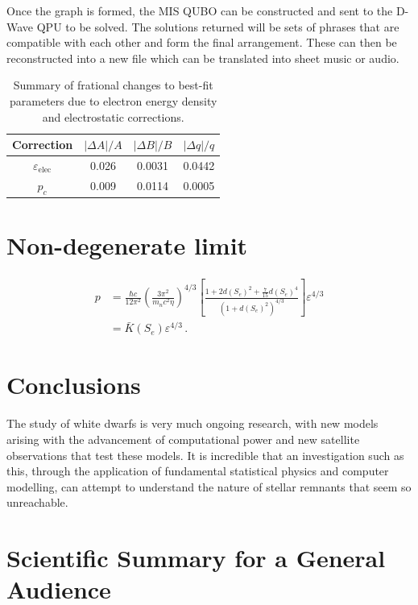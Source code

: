 \documentclass[aps,pra,10pt,twocolumn]{revtex4-2}
\begin{document}
Once the graph is formed, the MIS QUBO can be constructed and sent to the D-Wave QPU to be solved. The solutions returned will be sets of phrases that are compatible with each other and form the final arrangement. These can then be reconstructed into a new file which can be translated into sheet music or audio.

\begin{table}[ht] %
    \caption{Summary of frational changes to best-fit parameters due to electron energy density and electrostatic corrections.}
    \label{tab:corrections}
    \setlength{\tabcolsep}{12pt} %
    \renewcommand{\arraystretch}{1.5}
    \begin{tabular}{c|c|c|c} %
        \toprule
        \textbf{Correction} & $|\Delta A|/A$ & $|\Delta B|/B$ & $|\Delta q|/q$\\
        \midrule
        $\varepsilon_\mathrm{elec}$ & 0.026 & 0.0031 & 0.0442 \\
        $p_c$ & 0.009 & 0.0114 & 0.0005 \\
        \bottomrule
    \end{tabular}
\end{table}

\section{Non-degenerate limit}

\begin{align}
    p&=\frac{\hbar c}{12\pi^2}\left(\frac{3\pi^2}{m_n c^2\eta}\right)^{4/3}\left[\frac{1+2d(S_e)^2+\frac{7}{15}d(S_e)^4}{(1+d(S_e)^2)^{4/3}}\right]\varepsilon^{4/3}\\
    &=\bar{K}(S_e)\varepsilon^{4/3} \,.
    \label{eq:nondegeos}
\end{align}

\section{Conclusions}


The study of white dwarfs is very much ongoing research, with new models arising with the advancement of computational power and new satellite observations that test these models. It is incredible that an investigation such as this, through the application of fundamental statistical physics and computer modelling, can attempt to understand the nature of stellar remnants that seem so unreachable.

\nocite{*}


\clearpage

\onecolumngrid %

\section*{Scientific Summary for a General Audience}

\lipsum[1]
\end{document}
